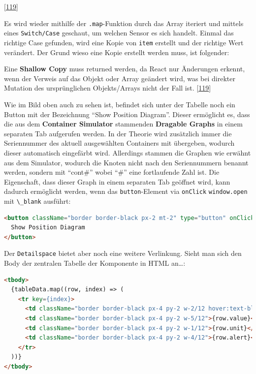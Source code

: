 \documentclass[
    headings=optiontotocandhead,%
    twoside,
    numbers=noenddot,%
    12pt, %
    titlepage, %
    parskip=full, %
    listof=leveldown, 
    numbers=noenddot, %
    a4paper,DIV=14,
    BCOR=15mm,
]{scrbook}
\newcommand{\passthrough}[1]{#1}
\renewenvironment{quote}{\begin{customblockquote}\list{}{\rightmargin=0em\leftmargin=0em}%
\item\relax\color{blockquote-text}\ignorespaces}{\unskip\unskip\endlist\end{customblockquote}}
\begin{document}
{[}\protect\hyperlink{ref-gpt-updateTableData}{119}{]}

Es wird wieder mithilfe der \passthrough{\lstinline!.map!}-Funktion
durch das Array iteriert und mittels eines
\passthrough{\lstinline!Switch/Case!} geschaut, um welchen Sensor es
sich handelt. Einmal das richtige Case gefunden, wird eine Kopie von
\passthrough{\lstinline!item!} erstellt und der richtige Wert verändert.
Der Grund wieso eine Kopie erstellt werden muss, ist folgender:

\begin{quote}
Eine \textbf{Shallow Copy} muss returned werden, da React nur Änderungen
erkennt, wenn der Verweis auf das Objekt oder Array geändert wird, was
bei direkter Mutation des ursprünglichen Objekts/Arrays nicht der Fall
ist. {[}\protect\hyperlink{ref-gpt-updateTableData}{119}{]}
\end{quote}

Wie im Bild oben auch zu sehen ist, befindet sich unter der Tabelle noch
ein Button mit der Bezeichnung ``Show Position Diagram''. Dieser
ermöglicht es, dass die aus dem \textbf{Container Simulator} stammenden
\textbf{Dragable Graphs} in einem separaten Tab aufgerufen werden. In
der Theorie wird zusätzlich immer die Seriennummer des aktuell
ausgewählten Containers mit übergeben, wodurch dieser automatisch
eingefärbt wird. Allerdings stammen die Graphen wie erwähnt aus dem
Simulator, wodurch die Knoten nicht nach den Seriennummern benannt
werden, sondern mit ``cont\#'' wobei ``\#'' eine fortlaufende Zahl ist.
Die Eigenschaft, dass dieser Graph in einem separaten Tab geöffnet wird,
kann dadurch ermöglicht werden, wenn das
\passthrough{\lstinline!button!}-Element via
\passthrough{\lstinline!onClick!} \passthrough{\lstinline!window.open!}
mit \passthrough{\lstinline!\_blank!} ausführt:

\begin{lstlisting}[language=HTML, caption={HTML Show Position Diagram Button}]
<button className="border border-black px-2 mt-2" type="button" onClick={() => window.open(`/graphs/${shipId}.html?highlight=${combinedSerialNumber}`, '_blank')}>
  Show Position Diagram
</button>
\end{lstlisting}

Der \passthrough{\lstinline!Detailspace!} bietet aber noch eine weitere
Verlinkung. Sieht man sich den Body der zentralen Tabelle der Komponente
in HTML an\ldots:

\begin{lstlisting}[language=HTML, caption={tbody HTML Element der Tabelle des Detailspaces}]
<tbody>
  {tableData.map((row, index) => (
    <tr key={index}>
      <td className="border border-black px-4 py-2 w-2/12 hover:text-blue-950 hover:underline" onClick={() => handelSelectEnironmentData(row.environment)}>{row.environment}</td>
      <td className="border border-black px-4 py-2 w-5/12">{row.value}</td>
      <td className="border border-black px-4 py-2 w-1/12">{row.unit}</td>
      <td className="border border-black px-4 py-2 w-4/12">{row.alert}</td>
    </tr>
  ))}
</tbody>
\end{lstlisting}
\end{document}
